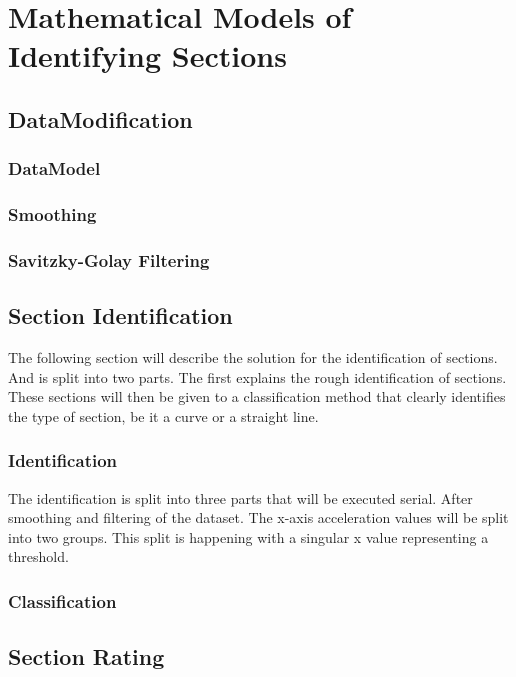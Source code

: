 \chapter{Mathematical Models of Identifying Sections}

\section{DataModification}

\subsection{DataModel}

\subsection{Smoothing}

\subsection{Savitzky-Golay Filtering}

\section{Section Identification}
The following section will describe the solution for the identification of sections. And is split into two parts. The first explains the rough identification of sections. These sections will then be given to a classification method that clearly identifies the type of section, be it a curve or a straight line. 

\subsection{Identification}
The identification is split into three parts that will be executed serial. After smoothing and filtering of the dataset. The x-axis acceleration values will be split into two groups. This split is happening with a singular x value representing a threshold.  

\subsection{Classification}

\section{Section Rating}